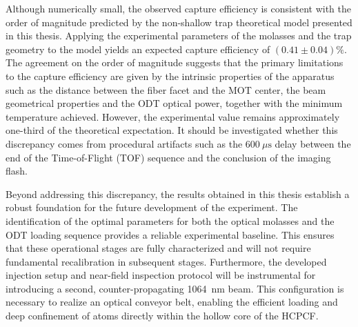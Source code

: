 \documentclass[../../thesis_main.tex]{subfiles}
\begin{document}
    Although numerically small, the observed capture efficiency is consistent with the order of magnitude predicted by the non-shallow trap theoretical model presented in this thesis. Applying the experimental parameters of the molasses and the trap geometry to the model yields an expected capture efficiency of $(0.41\pm0.04)\%$.
    The agreement on the order of magnitude suggests that the primary limitations to the capture efficiency are given by the intrinsic properties of the apparatus such as the distance between the fiber facet and the MOT center, the beam geometrical properties and the ODT optical power, together with the minimum temperature achieved.
    However, the experimental value remains approximately one-third of the theoretical expectation. It should be investigated whether this discrepancy comes from procedural artifacts such as the $600~\mu\text{s}$ delay between the end of the Time-of-Flight (TOF) sequence and the conclusion of the imaging flash.
    
    Beyond addressing this discrepancy, the results obtained in this thesis establish a robust foundation for the future development of the experiment. The identification of the optimal parameters for both the optical molasses and the ODT loading sequence provides a reliable experimental baseline. This ensures that these operational stages are fully characterized and will not require fundamental recalibration in subsequent stages. Furthermore, the developed injection setup and near-field inspection protocol will be instrumental for introducing a second, counter-propagating 1064~nm beam. This configuration is necessary to realize an optical conveyor belt, enabling the efficient loading and deep confinement of atoms directly within the hollow core of the HCPCF.
\end{document}
